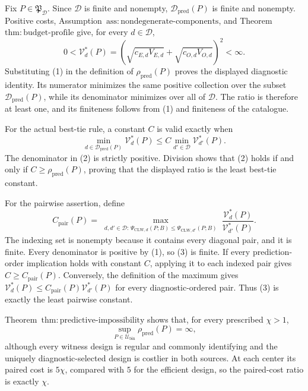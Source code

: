 Fix \(P\in\mathfrak P_{\mathcal D}\). Since \(\mathcal D\) is finite and nonempty, \(\mathcal D_{\mathrm{pred}}(P)\) is finite and nonempty. Positive costs, Assumption~\(\mathrm{ass{:}nondegenerate\text{-}components}\), and Theorem~\(\mathrm{thm{:}budget\text{-}profile}\) give, for every \(d\in\mathcal D\),
\[
 0<\mathcal V_d^*(P)
 =\left(\sqrt{c_{E,d}V_{E,d}}+
         \sqrt{c_{O,d}V_{O,d}}\right)^2<\infty.       \tag{1}
\]
Substituting (1) in the definition of \(\rho_{\mathrm{pred}}(P)\) proves the displayed diagnostic identity. Its numerator minimizes the same positive collection over the subset \(\mathcal D_{\mathrm{pred}}(P)\), while its denominator minimizes over all of \(\mathcal D\). The ratio is therefore at least one, and its finiteness follows from (1) and finiteness of the catalogue.

For the actual best-tie rule, a constant \(C\) is valid exactly when
\[
 \min_{d\in\mathcal D_{\mathrm{pred}}(P)}\mathcal V_d^*(P)
 \le C\min_{d'\in\mathcal D}\mathcal V_{d'}^*(P).    \tag{2}
\]
The denominator in (2) is strictly positive. Division shows that (2) holds if and only if \(C\ge\rho_{\mathrm{pred}}(P)\), proving that the displayed ratio is the least best-tie constant.

For the pairwise assertion, define
\[
 C_{\mathrm{pair}}(P)=
 \max_{\substack{d,d'\in\mathcal D:\,
 \Psi_{\mathrm{CLW},d}(P;B)
 \le\Psi_{\mathrm{CLW},d'}(P;B)}}
 \frac{\mathcal V_d^*(P)}{\mathcal V_{d'}^*(P)}.      \tag{3}
\]
The indexing set is nonempty because it contains every diagonal pair, and it is finite. Every denominator is positive by (1), so (3) is finite. If every prediction-order implication holds with constant \(C\), applying it to each indexed pair gives \(C\ge C_{\mathrm{pair}}(P)\). Conversely, the definition of the maximum gives \(\mathcal V_d^*(P)\le C_{\mathrm{pair}}(P)\mathcal V_{d'}^*(P)\) for every diagnostic-ordered pair. Thus (3) is exactly the least pairwise constant.

Theorem~\(\mathrm{thm{:}predictive\text{-}impossibility}\) shows that, for every prescribed \(\chi>1\),
\[
 \sup_{P\in\mathcal U_{\mathrm{bin}}}\rho_{\mathrm{pred}}(P)=\infty, \tag{4}
\]
although every witness design is regular and commonly identifying and the uniquely diagnostic-selected design is costlier in both sources. At each center its paired cost is \(5\chi\), compared with \(5\) for the efficient design, so the paired-cost ratio is exactly \(\chi\).

